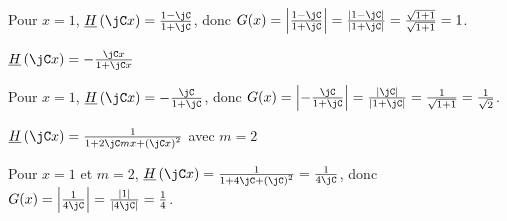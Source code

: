 
\begin{corrige}
	Pour $x=1$, $\underline{H}\left(\jC x \right)=\frac{1-\jC}{1+\jC}$, donc
	$
	G(x)= \left| \frac{1-\jC}{1+\jC} \right|
	= \frac{\left| 1-\jC \right|}{\left| 1+\jC \right|} = \frac{\sqrt{1 + 1} }{\sqrt{1 + 1} } = 1
	$.
\end{corrige}




\begin{enonce}
	$\underline{H}\left(\jC x \right)=-\frac{\jC x}{1+\jC x}$
\end{enonce}


\begin{corrige}
	Pour $x=1$, $\underline{H}\left(\jC x \right)=-\frac{\jC}{1+\jC}$, donc
	$
	G(x)= \left| -\frac{\jC}{1+\jC} \right|
	= \frac{\left| \jC \right|}{\left| 1+\jC \right|} = \frac{1 }{\sqrt{1 + 1} } = \frac{1}{\sqrt{2}}
	$.
\end{corrige}




\begin{enonce}
	$\underline{H}\left(\jC x \right)=\frac{1}{1+2\jC mx+\left(\jC x\right)^2}$ avec $m=2$
\end{enonce}


\begin{corrige}
	Pour $x=1$ et $m=2$, $\underline{H}\left(\jC x \right)=\frac{1}{1+4\jC +\left(\jC \right)^2} = \frac{1}{4\jC}$, donc
	$
	G(x)= \left| \frac{1}{4\jC} \right|
	= \frac{\left| 1 \right|}{\left| 4\jC \right|} = \frac{1}{4}
	$.
\end{corrige}


\finEntrainement






